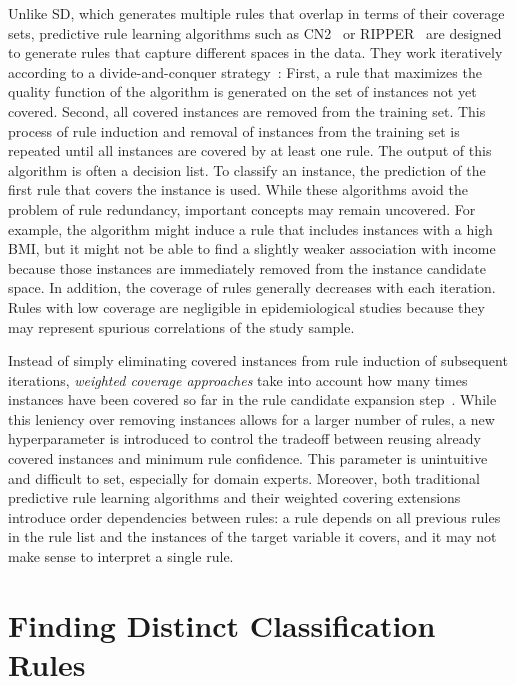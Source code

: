 \documentclass[
  oneside]{book}
\begin{document}
Unlike SD, which generates multiple rules that overlap in terms of their coverage sets, predictive rule learning algorithms such as CN2~\autocite{Clark:CN289} or RIPPER~\autocite{Cohen:RIPPER95} are designed to generate rules that capture different spaces in the data.
They work iteratively according to a divide-and-conquer strategy~\autocite{Fuernkranz:12}:
First, a rule that maximizes the quality function of the algorithm is generated on the set of instances not yet covered.
Second, all covered instances are removed from the training set.
This process of rule induction and removal of instances from the training set is repeated until all instances are covered by at least one rule.
The output of this algorithm is often a decision list.
To classify an instance, the prediction of the first rule that covers the instance is used.
While these algorithms avoid the problem of rule redundancy, important concepts may remain uncovered.
For example, the algorithm might induce a rule that includes instances with a high BMI, but it might not be able to find a slightly weaker association with income because those instances are immediately removed from the instance candidate space.
In addition, the coverage of rules generally decreases with each iteration.
Rules with low coverage are negligible in epidemiological studies because they may represent spurious correlations of the study sample.

Instead of simply eliminating covered instances from rule induction of subsequent iterations, \emph{weighted coverage approaches} take into account how many times instances have been covered so far in the rule candidate expansion step~\autocite{Lavravc:CN2-SD04}.
While this leniency over removing instances allows for a larger number of rules, a new hyperparameter is introduced to control the tradeoff between reusing already covered instances and minimum rule confidence.
This parameter is unintuitive and difficult to set, especially for domain experts.
Moreover, both traditional predictive rule learning algorithms and their weighted covering extensions introduce order dependencies between rules: a rule depends on all previous rules in the rule list and the instances of the target variable it covers, and it may not make sense to interpret a single rule.

\hypertarget{sdclu-method}{%
\section{Finding Distinct Classification Rules}\label{sdclu-method}}
\end{document}
